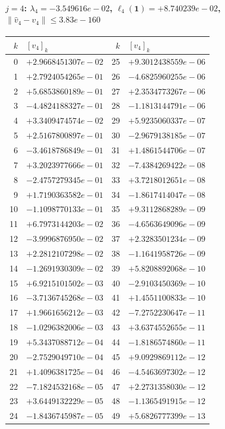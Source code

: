 \documentclass[11pt]{article}
\begin{document}
\paragraph{$j = 4$: $\lambda_{4} = -3.549616e-02$, \quad $\ell_{4}(\mathbf{1}) = +8.740239e-02$, \quad $\|\hat v_{4} - v_{4}\| \leq 3.83e-160$}
\begin{center}
{\footnotesize
\begin{tabular}{r@{\;\;}l@{\quad}r@{\;\;}l}
\toprule
$k$ & $[v_{4}]_k$ & $k$ & $[v_{4}]_k$ \\
\midrule
0 & $+2.9668451307e-02$ & 25 & $+9.3012438559e-06$ \\
1 & $+2.7924054265e-01$ & 26 & $-4.6825960255e-06$ \\
2 & $+5.6853860189e-01$ & 27 & $+2.3534773267e-06$ \\
3 & $-4.4824188327e-01$ & 28 & $-1.1813144791e-06$ \\
4 & $+3.3409474574e-02$ & 29 & $+5.9235060337e-07$ \\
5 & $+2.5167800897e-01$ & 30 & $-2.9679138185e-07$ \\
6 & $-3.4618786849e-01$ & 31 & $+1.4861544706e-07$ \\
7 & $+3.2023977666e-01$ & 32 & $-7.4384269422e-08$ \\
8 & $-2.4757279345e-01$ & 33 & $+3.7218012651e-08$ \\
9 & $+1.7190363582e-01$ & 34 & $-1.8617414047e-08$ \\
10 & $-1.1098770133e-01$ & 35 & $+9.3112868289e-09$ \\
11 & $+6.7973144203e-02$ & 36 & $-4.6563649096e-09$ \\
12 & $-3.9996876950e-02$ & 37 & $+2.3283501234e-09$ \\
13 & $+2.2812107298e-02$ & 38 & $-1.1641958726e-09$ \\
14 & $-1.2691930309e-02$ & 39 & $+5.8208892068e-10$ \\
15 & $+6.9215101502e-03$ & 40 & $-2.9103450369e-10$ \\
16 & $-3.7136745268e-03$ & 41 & $+1.4551100833e-10$ \\
17 & $+1.9661656212e-03$ & 42 & $-7.2752230647e-11$ \\
18 & $-1.0296382006e-03$ & 43 & $+3.6374552655e-11$ \\
19 & $+5.3437088712e-04$ & 44 & $-1.8186574860e-11$ \\
20 & $-2.7529049710e-04$ & 45 & $+9.0929869112e-12$ \\
21 & $+1.4096381725e-04$ & 46 & $-4.5463697302e-12$ \\
22 & $-7.1824532168e-05$ & 47 & $+2.2731358030e-12$ \\
23 & $+3.6449132229e-05$ & 48 & $-1.1365491915e-12$ \\
24 & $-1.8436745987e-05$ & 49 & $+5.6826777399e-13$ \\
\bottomrule
\end{tabular}
}
\end{center}
\end{document}
